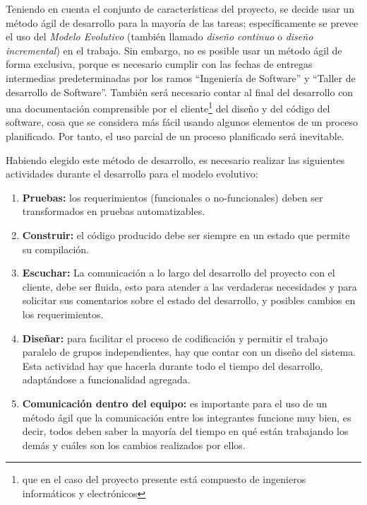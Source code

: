 \documentclass[letterpaper,spanish,10pt]{article}
\begin{document}




Teniendo en cuenta el conjunto de caracter\'isticas del proyecto, se
decide usar un m\'etodo \'agil de desarrollo para la
mayor\'ia de las tareas; espec\'ificamente se prevee el uso del \emph{Modelo
Evolutivo} (tambi\'en llamado \emph{dise\~no continuo} o \emph{dise\~no
incremental}) en el trabajo. Sin embargo, no es posible
usar un m\'etodo \'agil de forma exclusiva, porque es necesario cumplir con
las fechas de entregas intermedias predeterminadas por los ramos
``Ingenier\'ia de Software'' y ``Taller de desarrollo de Software''.
Tambi\'en ser\'a necesario contar al final del desarrollo con una
documentaci\'on comprensible por el cliente\footnote{que en el caso del
  proyecto presente est\'a compuesto de ingenieros inform\'aticos y
  electr\'onicos} del dise\~no y del c\'odigo del software, cosa que se
considera m\'as f\'acil usando algunos elementos de un proceso planificado.
Por
tanto, el uso parcial de un proceso planificado ser\'a inevitable.

Habiendo elegido este m\'etodo de desarrollo, es necesario realizar las
siguientes actividades durante el desarrollo para el modelo evolutivo:

\begin{enumerate}
\item \textbf{Pruebas:} los requerimientos (funcionales o no-funcionales) deben
  ser transformados en pruebas automatizables.
\item \textbf{Construir:} el c\'odigo producido debe ser siempre en un
  estado que permite su compilaci\'on.
\item \label{escuchar} \textbf{Escuchar:} La comunicaci\'on a lo largo del desarrollo del proyecto
con el cliente, debe ser fluida, esto para atender a las 
  verdaderas necesidades y para solicitar sus comentarios sobre el
  estado del desarrollo, y posibles cambios en los requerimientos.
\item \textbf{Dise\~nar:} para facilitar el proceso de codificaci\'on y permitir el
  trabajo paralelo de grupos independientes, hay que contar con un
  dise\~no del sistema.
  Esta actividad hay que hacerla durante todo el tiempo del desarrollo,
  adapt\'andose a funcionalidad agregada.
\item \label{comunicar} \textbf{Comunicaci\'on dentro del equipo:} es importante
  para el uso de un m\'etodo \'agil que la comunicaci\'on entre los integrantes funcione
  muy bien, es decir, todos deben saber la mayor\'ia del tiempo en qu\'e
  est\'an trabajando los dem\'as y cu\'ales son los cambios realizados por
  ellos.
\end{enumerate}
\end{document}
